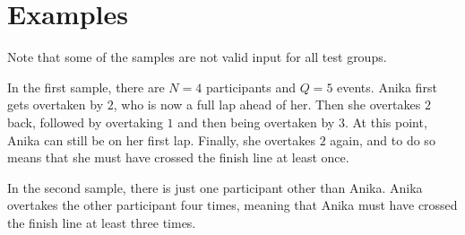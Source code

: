 \section*{Examples}
Note that some of the samples are not valid input for all test groups.

In the first sample, there are $N = 4$ participants and $Q = 5$ events.
Anika first gets overtaken by $2$, who is now a full lap ahead of her. Then she overtakes $2$ back, followed by overtaking $1$ and then being overtaken by $3$. At this point, Anika can still be on her first lap.  Finally, she overtakes $2$ again, and to do so means that she must have crossed the finish line at least once.

In the second sample, there is just one participant other than Anika. Anika overtakes the other participant four times, meaning that Anika must have crossed the finish line at least three times.
